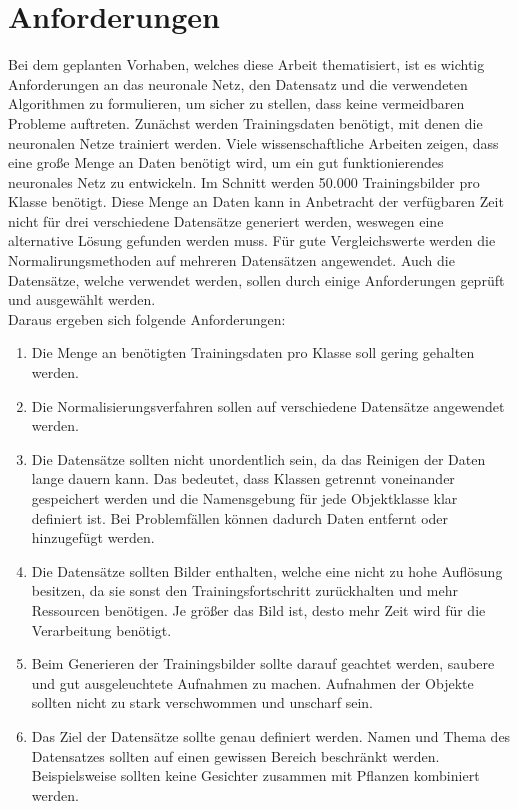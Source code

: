\section{Anforderungen}\label{s.anforderungen}
Bei dem geplanten Vorhaben, welches diese Arbeit thematisiert, ist es wichtig Anforderungen an das neuronale Netz, den Datensatz und die verwendeten Algorithmen zu formulieren, um sicher zu stellen, dass keine vermeidbaren Probleme auftreten. Zunächst werden Trainingsdaten benötigt, mit denen die neuronalen Netze trainiert werden. Viele wissenschaftliche Arbeiten zeigen, dass eine große Menge an Daten benötigt wird, um ein gut funktionierendes neuronales Netz zu entwickeln. Im Schnitt werden 50.000 Trainingsbilder pro Klasse benötigt. Diese Menge an Daten kann in Anbetracht der verfügbaren Zeit nicht für drei verschiedene Datensätze generiert werden, weswegen eine alternative Lösung gefunden werden muss. Für gute Vergleichswerte werden die Normalirungsmethoden auf mehreren Datensätzen angewendet. Auch die Datensätze, welche verwendet werden, sollen durch einige Anforderungen geprüft und ausgewählt werden.\\  
Daraus ergeben sich folgende Anforderungen:
\begin{enumerate} 
\item Die Menge an benötigten Trainingsdaten pro Klasse soll gering gehalten werden.
\item Die Normalisierungsverfahren sollen auf verschiedene Datensätze angewendet werden.
\item Die Datensätze sollten nicht unordentlich sein, da das Reinigen der Daten lange dauern kann. Das bedeutet, dass Klassen getrennt voneinander gespeichert werden und die Namensgebung für jede Objektklasse klar definiert ist. Bei Problemfällen können dadurch Daten entfernt oder hinzugefügt werden.
\item Die Datensätze sollten Bilder enthalten, welche eine nicht zu hohe Auflösung besitzen, da sie sonst den Trainingsfortschritt zurückhalten und mehr Ressourcen benötigen. Je größer das Bild ist, desto mehr Zeit wird für die Verarbeitung benötigt.
\item Beim Generieren der Trainingsbilder sollte darauf geachtet werden, saubere und gut ausgeleuchtete Aufnahmen zu machen. Aufnahmen der Objekte sollten nicht zu stark verschwommen und unscharf sein. 
\item Das Ziel der Datensätze sollte genau definiert werden. Namen und Thema des Datensatzes sollten auf einen gewissen Bereich beschränkt werden. Beispielsweise sollten keine Gesichter zusammen mit Pflanzen kombiniert werden. 
\end{enumerate}
